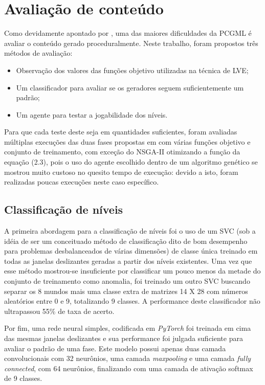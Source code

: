 \section{Avaliação de conteúdo}

Como devidamente apontado por \cite{pcg2013}, uma das maiores dificuldades da PCGML é avaliar o conteúdo gerado proceduralmente. Neste trabalho, foram propostos três métodos de avaliação:

\begin{itemize}
	\item Observação dos valores das funções objetivo utilizadas na técnica de LVE;
	\item Um classificador para avaliar se os geradores seguem suficientemente um padrão;
	\item Um agente para testar a jogabilidade dos níveis.
\end{itemize}

Para que cada teste deste seja em quantidades suficientes, foram avaliadas múltiplas execuções das duas fases propostas em \cite{marioGAN} com várias funções objetivo e conjunto de treinamento, com exceção do NSGA-II otimizando a função da equação (2.3), pois o uso do agente escolhido dentro de um algoritmo genético se mostrou muito custoso no quesito tempo de execução: devido a isto, foram realizadas poucas execuções neste caso específico.

\subsection{Classificação de níveis}

A primeira abordagem para a classificação de níveis foi o uso de um SVC (sob a idéia de ser um conceituado método de classificação dito de bom desempenho para problemas desbalanceados de várias dimensões) de classe única treinado em todas as janelas deslizantes geradas a partir dos níveis existentes. Uma vez que esse método mostrou-se insuficiente por classificar um pouco menos da metade do conjunto de treinamento como anomalia, foi treinado um outro SVC buscando separar os 8 mundos mais uma classe extra de matrizes 14 X 28 com números aleatórios entre 0 e 9, totalizando 9 classes. A performance deste classificador não ultrapassou 55\% de taxa de acerto.

Por fim, uma rede neural simples, codificada em \textit{PyTorch} foi treinada em cima das mesmas janelas deslizantes e sua performance foi julgada suficiente para avaliar o padrão de uma fase. Este modelo possui apenas duas camada convolucionais com 32 neurônios, uma camada \textit{maxpooling} e uma camada \textit{fully connected}, com 64 neurônios, finalizando com uma camada de ativação softmax de 9 classes.

